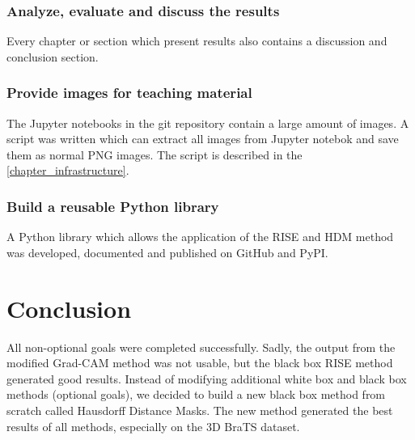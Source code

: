 \subsubsection{Analyze, evaluate and discuss the results}
Every chapter or section which present results also contains a discussion and conclusion section.

\subsubsection{Provide images for teaching material}
The Jupyter notebooks in the git repository contain a large amount of images. A script was written which can extract all images from Jupyter notebok and save them as normal PNG images. The script is described in the \autoref{chapter_infrastructure}.

\subsubsection{Build a reusable Python library}
A Python library which allows the application of the RISE and HDM method was developed, documented and published on GitHub and PyPI.

\section{Conclusion}
All non-optional goals were completed successfully. Sadly, the output from the modified Grad-CAM method was not usable, but the black box RISE method generated good results. Instead of modifying additional white box and black box methods (optional goals), we decided to build a new black box method from scratch called Hausdorff Distance Masks. The new method generated the best results of all methods, especially on the 3D BraTS dataset.
